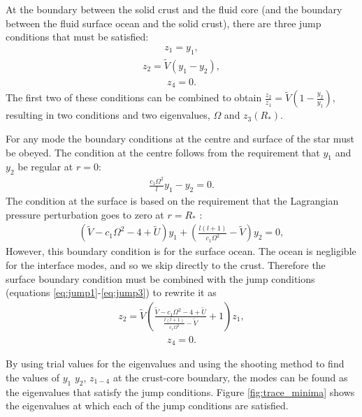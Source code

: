 \documentclass[fleqn,usenatbib]{mnras}
\begin{document}
\hspace{\parindent}At the boundary between the solid crust and the fluid core (and the boundary between the fluid surface ocean and the solid crust), there are three jump conditions that must be satisfied:
\begin{align}
z_1=y_1,
\label{eq:jump1}
\end{align}
\begin{align}
z_2=\tilde{V}(y_1-y_2),
\label{eq:jump2}
\end{align}
\begin{align}
z_4=0.
\label{eq:jump3}
\end{align}
\noindent The first two of these conditions can be combined to obtain $\frac{z_2}{z_1}=\tilde{V}\left(1-\frac{y_2}{y_1}\right)$, resulting in two conditions and two eigenvalues, $\Omega$ and $z_3(R_*)$. 



\hspace{\parindent}For any mode the boundary conditions at the centre and surface of the star must be obeyed. The condition at the centre follows from the requirement that $y_1$ and $y_2$ be regular at $r=0$:
\begin{align}
\frac{c_1\Omega^2}{l}y_1-y_2=0.
\label{eq:core_condition}
\end{align}
\noindent The condition at the surface is based on the requirement that the Lagrangian pressure perturbation goes to zero at $r=R_*$ :
\begin{align}
\left(\tilde{V}-c_1\Omega^2-4+\tilde{U}\right)y_1+\left(\frac{l(l+1)}{c_1\Omega^2}-\tilde{V}\right)y_2=0,
\label{eq:surface_condition}
\end{align}
\noindent However, this boundary condition is for the surface ocean. The ocean is negligible for the interface modes, and so we skip directly to the crust. Therefore the surface boundary condition must be combined with the jump conditions (equations \ref{eq:jump1}-\ref{eq:jump3}) to rewrite it as
\begin{align}
z_2=\tilde{V}\left(\frac{\tilde{V}-c_1\Omega^2-4+\tilde{U}}{\frac{l(l+1)}{c_1\Omega^2}-\tilde{V}}+1\right)z_1,
\label{eq:surface_boundary_modified_1}
\end{align}
\begin{align}
z_4=0.
\label{eq:surface_boundary_modified_2}
\end{align}



\hspace{\parindent}By using trial values for the eigenvalues and using the shooting method to find the values of $y_1$ $y_2$, $z_{1-4}$ at the crust-core boundary, the modes can be found as the eigenvalues that satisfy the jump conditions. Figure \ref{fig:trace_minima} shows the eigenvalues at which each of the jump conditions are satisfied.
\end{document}
